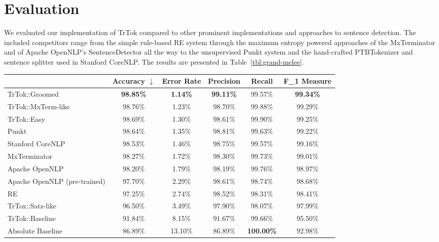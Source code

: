 \section{Evaluation}
\label{sec:eval}

We evaluated our implementation of TrTok compared to other prominent
implementations and approaches to sentence detection. The included
competitors range from the simple rule-based RE system through the
maximum entropy powered approaches of the MxTerminator and of Apache
OpenNLP's SentenceDetector all the way to the unsupervised Punkt
system and the hand-crafted PTBTokenizer and sentence splitter used in
Stanford CoreNLP. The results are presented in
Table~\ref{tbl:grand-melee}.

\begin{table*}
  \begin{center}
    \begin{tabular}{ | l | c | c | c | c | c | }
      \hline
      & Accuracy $\downarrow$ & Error Rate & Precision
      & Recall & F_1 Measure \\ \hline
      TrTok::Groomed & \textbf{98.85\%} & \textbf{1.14\%} & \textbf{99.11\%}
                     & 99.57\% & \textbf{99.34\%} \\ \hline
      TrTok::MxTerm-like & 98.76\% & 1.23\% & 98.70\%
                         & 99.88\% & 99.29\% \\ \hline
      TrTok::Easy & 98.69\% & 1.30\% & 98.61\%
                  & 99.90\% & 99.25\% \\ \hline
      Punkt & 98.64\% & 1.35\% & 98.81\%
            & 99.63\% & 99.22\% \\ \hline
      Stanford CoreNLP & 98.53\% & 1.46\% & 98.75\%
                       & 99.57\% & 99.16\% \\ \hline
      MxTerminator & 98.27\% & 1.72\% & 98.30\%
                   & 99.73\% & 99.01\% \\ \hline
      Apache OpenNLP & 98.20\% & 1.79\% & 98.19\%
                     & 99.76\% & 98.97\% \\ \hline
      Apache OpenNLP (pre-trained) & 97.70\% & 2.29\% & 98.61\%
                                   & 98.74\% & 98.68\% \\ \hline
      RE & 97.25\% & 2.74\% & 98.52\%
         & 98.31\% & 98.41\% \\ \hline
      TrTox::Satz-like & 96.50\% & 3.49\% & 97.90\%
                       & 98.07\% & 97.99\% \\ \hline
      TrTok::Baseline & 91.84\% & 8.15\% & 91.67\%
                      & 99.66\% & 95.50\% \\ \hline
      Absolute Baseline & 86.89\% & 13.10\% & 86.89\%
                        & \textbf{100.00\%} & 92.98\% \\ \hline
    \end{tabular}
  \end{center}
  \caption[Performance of sentence detectors on the Brown corpus]
    {The performance of the various sentence detectors on the Brown corpus.}
  \label{tbl:grand-melee}
\end{table*}

